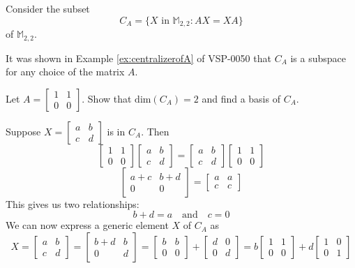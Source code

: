 \documentclass{ximera}
\begin{document}
\begin{example}\label{ex:CAbasis}
Consider the subset
\begin{equation*}
C_A = \{X \mbox{ in } \mathbb{M}_{2,2} : AX = XA \}
\end{equation*}
of $\mathbb{M}_{2,2}$. 

It was shown in Example \ref{ex:centralizerofA} of VSP-0050 that $C_A$ is a subspace for any choice of the matrix $A$.

Let $A = 
\begin{bmatrix}
1 & 1 \\
0 & 0
\end{bmatrix}$.
Show that $\mbox{dim}(C_A) = 2$ and find a basis of $C_A$.

\begin{explanation}
 Suppose $X = 
\begin{bmatrix}
a & b \\
c & d
\end{bmatrix}$
 is in $C_A$.  
 Then
 $$\begin{bmatrix}1&1\\0&0\end{bmatrix}\begin{bmatrix}a&b\\c&d\end{bmatrix}=\begin{bmatrix}a&b\\c&d\end{bmatrix}\begin{bmatrix}1&1\\0&0\end{bmatrix}$$
 $$\begin{bmatrix}a+c&b+d\\0&0\end{bmatrix}=\begin{bmatrix}a&a\\c&c\end{bmatrix}$$
 This gives us two relationships:  
 $$b+d=a\quad\text{and}\quad c=0$$
 We can now express a generic element $X$ of $C_A$ as
 $$X=\begin{bmatrix}a&b\\c&d\end{bmatrix}=\begin{bmatrix}b+d&b\\0&d\end{bmatrix}=\begin{bmatrix}b&b\\0&0\end{bmatrix}+\begin{bmatrix}d&0\\0&d\end{bmatrix}=b\begin{bmatrix}1&1\\0&0\end{bmatrix}+d\begin{bmatrix}1&0\\0&1\end{bmatrix}$$
 

\end{explanation}
\end{example}
\end{document}
